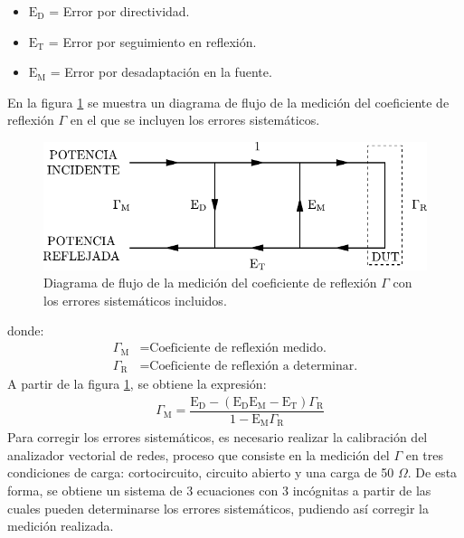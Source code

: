 \begin{itemize}
\item $\text{E}_{\text{D}}$ = Error por directividad.
\item $\text{E}_{\text{T}}$ = Error por seguimiento en reflexión.
\item $\text{E}_{\text{M}}$ = Error por desadaptación en la fuente.
\end{itemize}
En la figura \ref{fig_apE:1} se muestra un diagrama de flujo de la medición del coeficiente de reflexión $\Gamma$ en el que se incluyen los errores sistemáticos.
\begin{figure} [H]
\centering 
\includegraphics[scale = 1]{Figures/Apendice_E/ApendiceE_1.pdf}
\caption{Diagrama de flujo de la medición del coeficiente de reflexión $\Gamma$ con los errores sistemáticos incluidos.}
\label{fig_apE:1}
\end{figure}
donde:
\begin{align*}
\Gamma_{\text{M}} &= \text{Coeficiente de reflexión medido.}\\
\Gamma_{\text{R}} &= \text{Coeficiente de reflexión a determinar.}
\end{align*}
A partir de la figura \ref{fig_apE:1}, se obtiene la expresión:
\begin{align}
&\Gamma_{\text{M}} = \dfrac{\text{E}_{\text{D}} - \left(\text{E}_{\text{D}}\text{E}_{\text{M}} - \text{E}_{\text{T}}\right)\Gamma_{\text{R}}}{1 - \text{E}_{\text{M}}\Gamma_{\text{R}}}
\label{ec_apE:1}
\end{align}
Para corregir los errores sistemáticos, es necesario realizar la calibración del analizador vectorial de redes, proceso que consiste en la medición del $\Gamma$ en tres condiciones de carga: cortocircuito, circuito abierto y una carga de 50 $\Omega$. De esta forma, se obtiene un sistema de 3 ecuaciones con 3 incógnitas a partir de las cuales pueden determinarse los errores sistemáticos, pudiendo así corregir la medición realizada.

